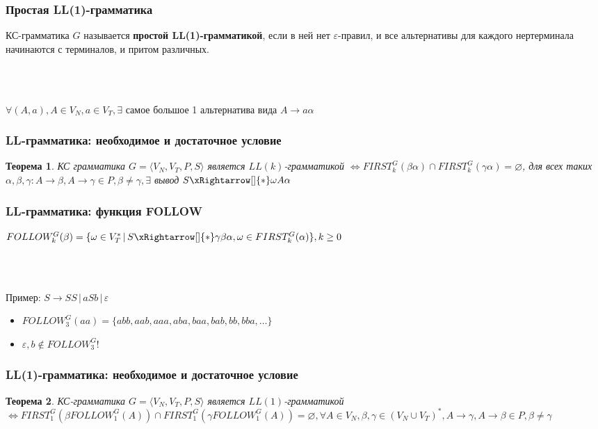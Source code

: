 \documentclass{beamer}
\newtheorem{rutheorem}{Теорема}
\newcommand{\derive}[0]{\xRightarrow[]{*}}
\begin{document}
\begin{frame}[fragile]
  \transwipe[direction=90]
  \frametitle{Простая LL(1)-грамматика}
  КС-грамматика $G$ называется \textbf{простой LL(1)-грамматикой}, если в ней нет $\varepsilon$-правил, и все альтернативы для каждого нертерминала начинаются с терминалов, и притом различных. 
  
  ~\\~ 
  
  $\forall (A, a), A \in V_N, a \in V_T, \exists $ самое большое 1 альтернатива вида $A \rightarrow a \alpha$
  
\end{frame}


\begin{frame}[fragile]
  \transwipe[direction=90]
  \frametitle{LL-грамматика: необходимое и достаточное условие}
  \begin{rutheorem}
  КС грамматика $G = \langle V_N, V_T, P, S \rangle$ является $LL(k)$-грамматикой $\Leftrightarrow FIRST^G_k(\beta \alpha) \cap FIRST^G_k(\gamma \alpha) = \varnothing$, для всех таких $\alpha, \beta, \gamma: A \rightarrow \beta, A \rightarrow \gamma \in P, \beta \neq \gamma, \exists$ вывод $S \derive \omega A \alpha$
  \end{rutheorem}  

\end{frame}

\begin{frame}[fragile]
  \transwipe[direction=90]
  \frametitle{LL-грамматика: функция FOLLOW}
  $FOLLOW^G_k(\beta) = \{ \omega \in V_T^* \, | \, S \derive \gamma \beta \alpha, \omega \in FIRST^G_k(\alpha) \}, k \geq 0$

  ~\\~
  
   Пример: $S \rightarrow S S \, | \, a S b \, | \, \varepsilon$
   
   \begin{itemize}
     \item  $FOLLOW^G_3( a a ) = \{ a b b, a a b, a a a, a b a, b a a, b a b, b b, b b a, \dots \}$
     \item $\varepsilon, b \notin FOLLOW^G_3$!
   \end{itemize}
\end{frame}


\begin{frame}[fragile]
  \transwipe[direction=90]
  \frametitle{LL(1)-грамматика: необходимое и достаточное условие}
  \begin{rutheorem}
    КС-грамматика  $G = \langle V_N, V_T, P, S \rangle$ является $LL(1)$-грамматикой $\Leftrightarrow FIRST^G_1 (\beta FOLLOW^G_1(A)) \cap FIRST^G_1(\gamma FOLLOW^G_1(A)) = \varnothing, \forall A \in V_N, \beta, \gamma \in (V_N \cup V_T)^*, A \rightarrow \gamma, A \rightarrow \beta \in P, \beta \neq \gamma$
  \end{rutheorem}
  
\end{frame}
\end{document}
